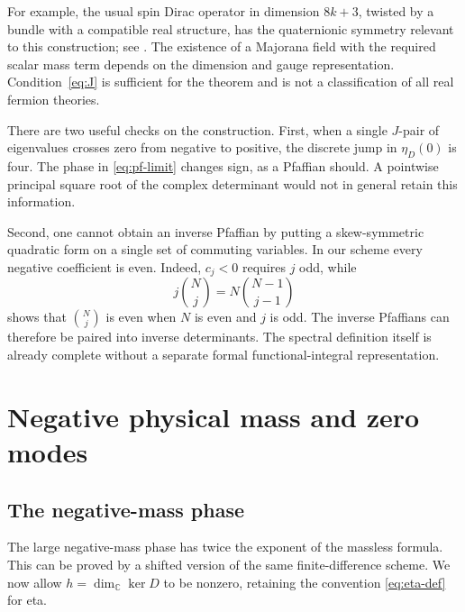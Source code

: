 \documentclass[11pt,a4paper]{article}
\theoremstyle{remark}
\newcommand{\C}{\mathbb C}
\numberwithin{equation}{section}
\begin{document}
For example, the usual spin Dirac operator in dimension $8k+3$,
twisted by a bundle with a compatible real structure, has the
quaternionic symmetry relevant to this construction; see
\cite[Section 1.3]{FM}. The existence of a Majorana field with the
required scalar mass term depends on the dimension and gauge
representation. Condition~\eqref{eq:J} is sufficient for the theorem
and is not a classification of all real fermion theories.

There are two useful checks on the construction. First, when a single
$J$-pair of eigenvalues crosses zero from negative to positive, the
discrete jump in $\eta_D(0)$ is four. The phase in
\eqref{eq:pf-limit} changes sign, as a Pfaffian should. A pointwise
principal square root of the complex determinant would not in general
retain this information.

Second, one cannot obtain an inverse Pfaffian by putting a
skew-symmetric quadratic form on a single set of commuting variables.
In our scheme every negative coefficient is even. Indeed, $c_j<0$
requires $j$ odd, while
\[
 j\binom Nj=N\binom{N-1}{j-1}
\]
shows that $\binom Nj$ is even when $N$ is even and $j$ is odd.
The inverse Pfaffians can therefore be paired into inverse
determinants. The spectral definition itself is already complete
without a separate formal functional-integral representation.

\section{Negative physical mass and zero modes}\label{sec:mass}

\subsection{The negative-mass phase}

The large negative-mass phase has twice the exponent of the
massless formula. This can be proved by a shifted version of the
same finite-difference scheme. We now allow $h=\dim_\C\ker D$ to
be nonzero, retaining the convention \eqref{eq:eta-def} for eta.
\end{document}
